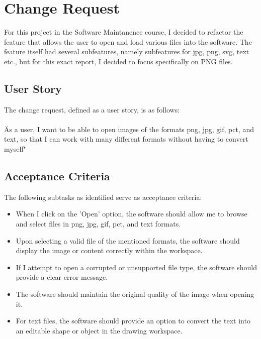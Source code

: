 \section{Change Request}
For this project in the Software Maintanence course, I decided to refactor the feature that allows the user to open and load various files into the software. The feature itself had several subfeatures, namely subfeatures for jpg, png, svg, text etc., but for this exact report, I decided to focus specifically on PNG files.

\subsection{User Story}
The change request, defined as a user story, is as follows:
\\\\
\"As a user, I want to be able to open images of the formats png, jpg, gif, pct, and text, so that I can work with many different formats without having to convert myself"

\subsection{Acceptance Criteria}
The following subtasks as identified serve as acceptance criteria:


\begin{itemize}
    \item When I click on the 'Open' option, the software should allow me to browse and select files in png, jpg, gif, pct, and text formats.
    \item Upon selecting a valid file of the mentioned formats, the software should display the image or content correctly within the workspace.
    \item If I attempt to open a corrupted or unsupported file type, the software should provide a clear error message.
    \item The software should maintain the original quality of the image when opening it.
    \item For text files, the software should provide an option to convert the text into an editable shape or object in the drawing workspace.
\end{itemize}
